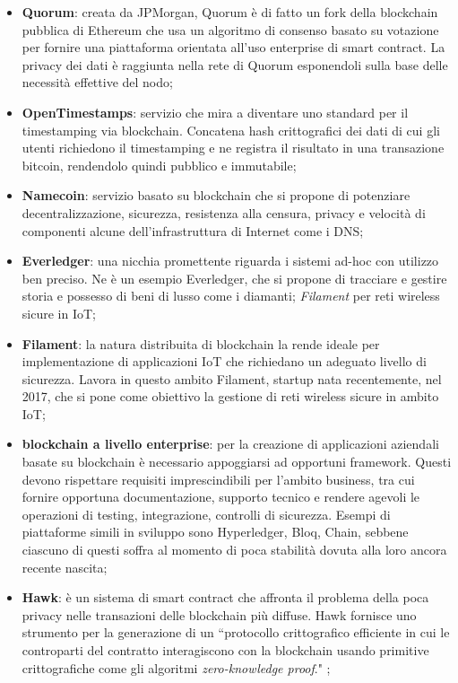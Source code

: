 \begin{itemize}
            \item \textbf{Quorum}: creata da JPMorgan, Quorum è di fatto un fork della blockchain pubblica di Ethereum che usa un algoritmo di consenso basato su votazione per fornire una piattaforma orientata all'uso enterprise di smart contract. La privacy dei dati è raggiunta nella rete di Quorum esponendoli sulla base delle necessità effettive del nodo;
            \item \textbf{OpenTimestamps}: servizio che mira a diventare uno standard per il timestamping via blockchain. Concatena hash crittografici dei dati di cui gli utenti richiedono il timestamping e ne registra il risultato in una transazione bitcoin, rendendolo quindi pubblico e immutabile;
            \item \textbf{Namecoin}: servizio basato su blockchain che si propone di potenziare decentralizzazione, sicurezza, resistenza alla censura, privacy e velocità di componenti alcune dell'infrastruttura di Internet come i DNS;
            \item \textbf{Everledger}: una nicchia promettente riguarda i sistemi ad-hoc con utilizzo ben preciso. Ne è un esempio Everledger, che si propone di tracciare e gestire storia e possesso di beni di lusso come i diamanti; \emph{Filament} per reti wireless sicure in IoT;
            \item \textbf{Filament}: la natura distribuita di blockchain la rende ideale per implementazione di applicazioni IoT che richiedano un adeguato livello di sicurezza. Lavora in questo ambito Filament, startup nata recentemente, nel 2017, che si pone come obiettivo la gestione di reti wireless sicure in ambito IoT;
            \item \textbf{blockchain a livello enterprise}: per la creazione di applicazioni aziendali basate su blockchain è necessario appoggiarsi ad opportuni framework. Questi devono rispettare requisiti imprescindibili per l'ambito business, tra cui fornire opportuna documentazione, supporto tecnico e rendere agevoli le operazioni di testing, integrazione, controlli di sicurezza. Esempi di piattaforme simili in sviluppo sono Hyperledger, Bloq, Chain, sebbene ciascuno di questi soffra al momento di poca stabilità dovuta alla loro ancora recente nascita;
            \item \textbf{Hawk}: è un sistema di smart contract che affronta il problema della poca privacy nelle transazioni delle blockchain più diffuse. Hawk fornisce uno strumento per la generazione di un ``protocollo crittografico efficiente in cui le controparti del contratto interagiscono con la blockchain usando primitive crittografiche come gli algoritmi \emph{zero-knowledge proof}." \cite{hawk};
        \end{itemize}

